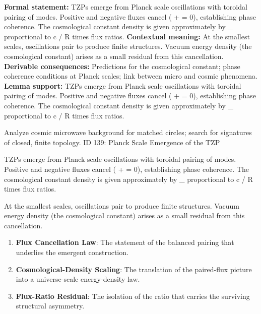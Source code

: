 \begingroup\footnotesize\setlength{\emergencystretch}{3em}\sloppy
\textbf{Formal statement:} TZPs emerge from Planck scale oscillations with toroidal pairing of modes. Positive and negative fluxes cancel (   +    = 0), establishing phase coherence. The cosmological constant density is given approximately by  \_  proportional to   c / R  times flux ratios.
\textbf{Contextual meaning:} At the smallest scales, oscillations pair to produce finite structures. Vacuum energy density (the cosmological constant) arises as a small residual from this cancellation.
\textbf{Derivable consequences:} Predictions for the cosmological constant; phase coherence conditions at Planck scales; link between micro and cosmic phenomena.
\textbf{Lemma support:} TZPs emerge from Planck scale oscillations with toroidal pairing of modes. Positive and negative fluxes cancel (   +    = 0), establishing phase coherence. The cosmological constant density is given approximately by  \_  proportional to   c / R  times flux ratios.\par
\endgroup

Analyze cosmic microwave background for matched circles; search for signatures of closed, finite topology. ID 139: Planck Scale Emergence of the TZP

TZPs emerge from Planck scale oscillations with toroidal pairing of modes. Positive and negative fluxes cancel (   +    = 0), establishing phase coherence. The cosmological constant density is given approximately by  \_  proportional to   c / R  times flux ratios.

At the smallest scales, oscillations pair to produce finite structures. Vacuum energy density (the cosmological constant) arises as a small residual from this cancellation.
\endgroup

\begin{enumerate}[leftmargin=1.6em,itemsep=6pt,topsep=4pt]
\item \textbf{Flux Cancellation Law}: The statement of the balanced pairing that underlies the emergent construction.
\item \textbf{Cosmological-Density Scaling}: The translation of the paired-flux picture into a universe-scale energy-density law.
\item \textbf{Flux-Ratio Residual}: The isolation of the ratio that carries the surviving structural asymmetry.
\end{enumerate}

